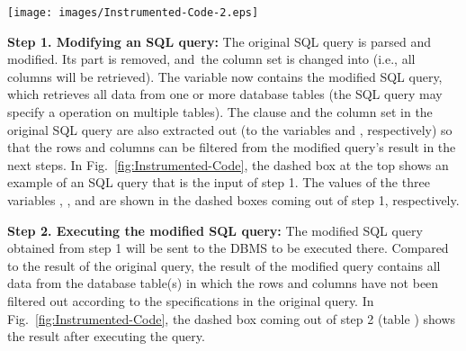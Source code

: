 

\begin{figure*}[tbp]
  \centering
  \texttt{[image: images/Instrumented-Code-2.eps]}\\
  \caption{Instrumented code to monitor the execution of SQL queries~\cite{icsm13}}\label{fig:Instrumented-Code}
\end{figure*}


\textbf{Step 1. Modifying an SQL query:}
The original SQL query is parsed and modified. Its
 part is removed, and~the column set is changed into 
(i.e., all columns will be retrieved). The  variable
now contains the modified SQL query, which retrieves all data from one
or more database tables (the SQL query may specify a 
operation on multiple tables). The  clause and the column
set in the original SQL query are also extracted out (to the variables
 and , respectively) so that the
rows and columns can be filtered from the modified query's result in
the next steps. In Fig.~\ref{fig:Instrumented-Code}, the dashed box
at the top shows an example of an SQL query that is the input of step
1. The values of the three variables ,
, and  are shown in the dashed boxes
coming out of step 1, respectively.


\vspace{0.04in}
\textbf{Step 2. Executing the modified SQL query:}
The modified SQL query obtained from step 1 will be sent to the DBMS
to be executed there. Compared to the result of the original query,
the result of the modified query contains all data from the database
table(s) in which the rows and columns have not been filtered out
according to the specifications in the original query. In
Fig.~\ref{fig:Instrumented-Code}, the dashed box coming out of step
2 (table ) shows the result after executing the
 query.

